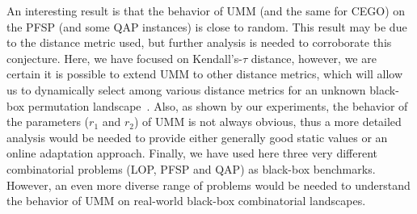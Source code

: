 \documentclass[sigconf,dvipsnames]{acmart}
\begin{document}
An interesting result is that the behavior of UMM (and the same for CEGO) on
the PFSP (and some QAP instances) is close to random. %
This result may be due to the distance
metric used, but further analysis is needed to corroborate this
conjecture. Here, we have focused on Kendall's-$\tau$ distance, however, we are certain it is
possible to extend UMM to other distance metrics, which will allow us to
dynamically select among various distance metrics for an unknown black-box
permutation landscape~\citep{ZaeStoBar2014:ppsn}. Also, as shown by our
experiments, the behavior of the parameters ($r_1$ and $r_2$) of UMM is not
always obvious, thus a more detailed analysis would be needed to provide either
generally good static values or an online adaptation approach. Finally, we have
used here three very different combinatorial problems (LOP, PFSP and QAP) as
black-box benchmarks. However, an even more diverse range of problems would be
needed to understand the behavior of UMM on real-world black-box combinatorial
landscapes.



\end{document}
